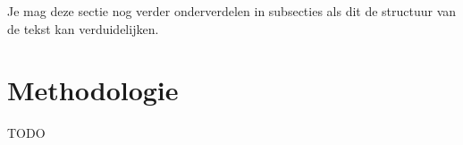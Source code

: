 

Je mag deze sectie nog verder onderverdelen in subsecties als dit de structuur van de tekst kan verduidelijken.

\section{Methodologie}%
\label{sec:methodologie}
TODO





